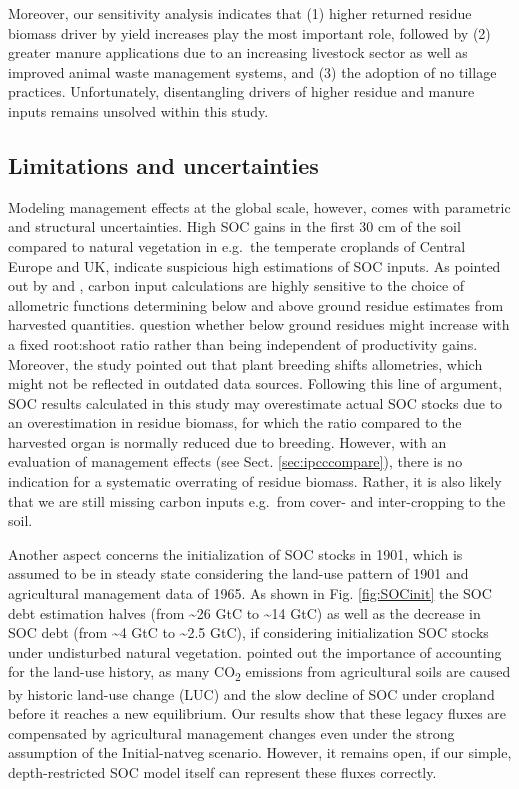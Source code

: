 \documentclass[gc, manuscript]{copernicus}
\begin{document}
Moreover, our sensitivity analysis indicates that (1) higher returned residue biomass driver by yield increases play the most important role, followed by (2) greater manure applications due to an increasing livestock sector as well as improved animal waste management systems, and (3) the adoption of no tillage practices. Unfortunately, disentangling drivers of higher residue and manure inputs remains unsolved within this study.

\hypertarget{limitations-and-uncertainties}{%
\subsection{Limitations and uncertainties}\label{limitations-and-uncertainties}}

Modeling management effects at the global scale, however, comes with parametric and structural uncertainties. High SOC gains in the first 30 cm of the soil compared to natural vegetation in e.g.~the temperate croplands of Central Europe and UK, indicate suspicious high estimations of SOC inputs. As pointed out by \citep{keel_large_2017} and \citep{smith_how_2020}, carbon input calculations are highly sensitive to the choice of allometric functions determining below and above ground residue estimates from harvested quantities. \citep{keel_large_2017} question whether below ground residues might increase with a fixed root:shoot ratio rather than being independent of productivity gains. Moreover, the study pointed out that plant breeding shifts allometries, which might not be reflected in outdated data sources. Following this line of argument, SOC results calculated in this study may overestimate actual SOC stocks due to an overestimation in residue biomass, for which the ratio compared to the harvested organ is normally reduced due to breeding. However, with an evaluation of management effects (see Sect. \ref{sec:ipcccompare}), there is no indication for a systematic overrating of residue biomass. Rather, it is also likely that we are still missing carbon inputs e.g.~from cover- and inter-cropping to the soil.

Another aspect concerns the initialization of SOC stocks in 1901, which is assumed to be in steady state considering the land-use pattern of 1901 and agricultural management data of 1965. As shown in Fig. \ref{fig:SOCinit} the SOC debt estimation halves (from \textasciitilde26 GtC to \textasciitilde14 GtC) as well as the decrease in SOC debt (from \textasciitilde4 GtC to \textasciitilde2.5 GtC), if considering initialization SOC stocks under undisturbed natural vegetation. \citep{pugh_simulated_2015} pointed out the importance of accounting for the land-use history, as many CO\textsubscript{2} emissions from agricultural soils are caused by historic land-use change (LUC) and the slow decline of SOC under cropland before it reaches a new equilibrium. Our results show that these legacy fluxes are compensated by agricultural management changes even under the strong assumption of the Initial-natveg scenario. However, it remains open, if our simple, depth-restricted SOC model itself can represent these fluxes correctly.
\end{document}
